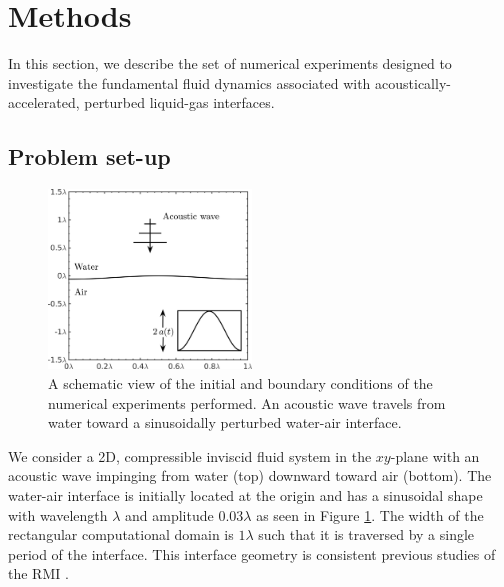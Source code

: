 \section{Methods} \label{sec:methods}%
In this section, we describe the set of numerical experiments designed
to investigate the fundamental fluid dynamics associated with
acoustically-accelerated, perturbed liquid-gas interfaces.

\subsection{Problem set-up}
\label{subsec:setup}
\begin{figure}
  \centering
  \includegraphics[width=0.48\textwidth]{./figs/lung_figs/usbe_model_schematic2} \hfill
  \caption[A schematic view of the model problem]{A schematic view of the initial and boundary conditions of the
    numerical experiments performed. An acoustic wave travels from water toward a sinusoidally perturbed water-air interface.}
  \label{fig:problem_schematic}
\end{figure}
% 
We consider a 2D, compressible inviscid fluid system in the $xy$-plane
with an acoustic wave impinging from water (top) downward toward air
(bottom). The water-air interface is initially located at the origin
and has a sinusoidal shape with wavelength $\lambda$ and amplitude
$0.03\lambda$ as seen in Figure \ref{fig:problem_schematic}. The width
of the rectangular computational domain is $1\lambda$ such that it is
traversed by a single period of the interface. This interface geometry
is consistent previous studies of the \ac{RMI}
\citep{Brouillette2002}.


